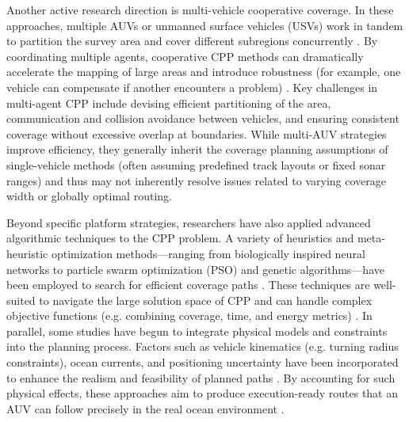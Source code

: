 \documentclass[compress]{cm}
\begin{document}
Another active research direction is multi-vehicle cooperative coverage. In these approaches, multiple AUVs or unmanned surface vehicles (USVs) work in tandem to partition the survey area and cover different subregions concurrently \cite{zhang2023multi, mu2025coverage, zhu2019complete, han2023hybrid}. By coordinating multiple agents, cooperative CPP methods can dramatically accelerate the mapping of large areas and introduce robustness (for example, one vehicle can compensate if another encounters a problem) \cite{zhang2023multi, mu2025coverage, zhu2019complete, han2023hybrid}. Key challenges in multi-agent CPP include devising efficient partitioning of the area, communication and collision avoidance between vehicles, and ensuring consistent coverage without excessive overlap at boundaries. While multi-AUV strategies improve efficiency, they generally inherit the coverage planning assumptions of single-vehicle methods (often assuming predefined track layouts or fixed sonar ranges) and thus may not inherently resolve issues related to varying coverage width or globally optimal routing.

Beyond specific platform strategies, researchers have also applied advanced algorithmic techniques to the CPP problem. A variety of heuristics and meta-heuristic optimization methods—ranging from biologically inspired neural networks to particle swarm optimization (PSO) and genetic algorithms—have been employed to search for efficient coverage paths \cite{kapetanovic2018side, tang2023coverage, cao2018real}. These techniques are well-suited to navigate the large solution space of CPP and can handle complex objective functions (e.g. combining coverage, time, and energy metrics) \cite{kapetanovic2018side, tang2023coverage, cao2018real}. In parallel, some studies have begun to integrate physical models and constraints into the planning process. Factors such as vehicle kinematics (e.g. turning radius constraints), ocean currents, and positioning uncertainty have been incorporated to enhance the realism and feasibility of planned paths \cite{kapetanovic2018side, zhang2021path}. By accounting for such physical effects, these approaches aim to produce execution-ready routes that an AUV can follow precisely in the real ocean environment \cite{kapetanovic2018side, zhang2021path}.
\end{document}
